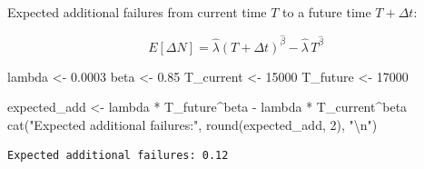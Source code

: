 \documentclass[
  letterpaper,
  DIV=11,
  numbers=noendperiod]{scrreprt}
\newenvironment{Shaded}{\begin{snugshade}}{\end{snugshade}}
\newcommand{\DecValTok}[1]{\textcolor[rgb]{0.68,0.00,0.00}{#1}}
\newcommand{\FloatTok}[1]{\textcolor[rgb]{0.68,0.00,0.00}{#1}}
\newcommand{\FunctionTok}[1]{\textcolor[rgb]{0.28,0.35,0.67}{#1}}
\newcommand{\NormalTok}[1]{\textcolor[rgb]{0.00,0.23,0.31}{#1}}
\newcommand{\OtherTok}[1]{\textcolor[rgb]{0.00,0.23,0.31}{#1}}
\newcommand{\SpecialCharTok}[1]{\textcolor[rgb]{0.37,0.37,0.37}{#1}}
\newcommand{\StringTok}[1]{\textcolor[rgb]{0.13,0.47,0.30}{#1}}
\begin{document}
Expected additional failures from current time \(T\) to a future time
\(T + \Delta t\):

\[E[\Delta N] = \hat{\lambda}(T + \Delta t)^{\hat{\beta}} - \hat{\lambda}\, T^{\hat{\beta}}\]

\begin{Shaded}
\begin{Highlighting}[]
\NormalTok{lambda    }\OtherTok{\textless{}{-}} \FloatTok{0.0003}
\NormalTok{beta      }\OtherTok{\textless{}{-}} \FloatTok{0.85}
\NormalTok{T\_current }\OtherTok{\textless{}{-}} \DecValTok{15000}
\NormalTok{T\_future  }\OtherTok{\textless{}{-}} \DecValTok{17000}

\NormalTok{expected\_add }\OtherTok{\textless{}{-}}\NormalTok{ lambda }\SpecialCharTok{*}\NormalTok{ T\_future}\SpecialCharTok{\^{}}\NormalTok{beta }\SpecialCharTok{{-}}\NormalTok{ lambda }\SpecialCharTok{*}\NormalTok{ T\_current}\SpecialCharTok{\^{}}\NormalTok{beta}
\FunctionTok{cat}\NormalTok{(}\StringTok{"Expected additional failures:"}\NormalTok{, }\FunctionTok{round}\NormalTok{(expected\_add, }\DecValTok{2}\NormalTok{), }\StringTok{"}\SpecialCharTok{\textbackslash{}n}\StringTok{"}\NormalTok{)}
\end{Highlighting}
\end{Shaded}

\begin{verbatim}
Expected additional failures: 0.12 
\end{verbatim}
\end{document}
